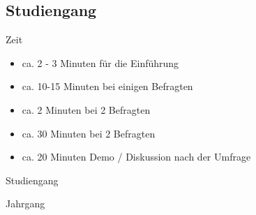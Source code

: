 
\subsection{Studiengang}

\begin{frame}{Zeit}
\begin{itemize}
    \item ca. 2 - 3 Minuten für die Einführung
    \item ca. 10-15 Minuten bei einigen Befragten
    \item ca. 2 Minuten bei 2 Befragten
    \item ca. 30 Minuten bei 2 Befragten
    \item ca. 20 Minuten Demo / Diskussion nach der Umfrage
\end{itemize}
\end{frame}

\begin{frame}{Studiengang}
\end{frame}

\begin{frame}{Jahrgang}
\end{frame}
